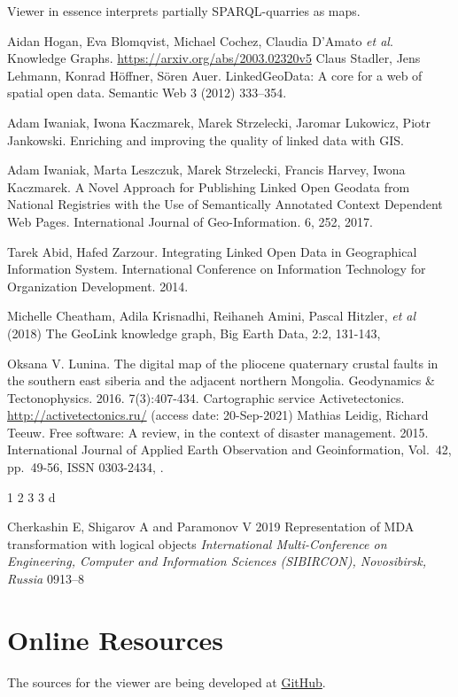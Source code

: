 \documentclass[
]{ceurart}
\begin{document}
Viewer in essence interprets partially SPARQL-quarries as maps.

\begin{acknowledgments}

\end{acknowledgments}

% 

\begin{thebibliography}{99}

 Aidan Hogan, Eva Blomqvist, Michael Cochez, Claudia D’Amato \emph{et al}. Knowledge Graphs. \url{https://arxiv.org/abs/2003.02320v5}
 Claus Stadler, Jens Lehmann, Konrad Höffner, Sören Auer. LinkedGeoData: A core for a web of spatial open data. Semantic Web 3 (2012) 333–354. 

 Adam Iwaniak, Iwona Kaczmarek, Marek Strzelecki, Jaromar Lukowicz, Piotr Jankowski. Enriching and improving the quality of linked data with GIS. 

 Adam Iwaniak, Marta Leszczuk, Marek Strzelecki, Francis Harvey, Iwona Kaczmarek. A Novel Approach for Publishing Linked Open Geodata from National Registries with the Use of Semantically Annotated Context Dependent Web Pages. International Journal of Geo-Information. 6, 252, 2017. 

 Tarek Abid, Hafed Zarzour. Integrating Linked Open Data in Geographical
Information System. International Conference on Information Technology for Organization Development. 2014.

 Michelle Cheatham, Adila Krisnadhi, Reihaneh Amini, Pascal Hitzler, \emph{et al} (2018) The GeoLink knowledge graph, Big Earth Data, 2:2, 131-143, 

 Oksana V. Lunina.  The digital map of the pliocene quaternary crustal faults in the southern east siberia and the adjacent northern Mongolia. Geodynamics \& Tectonophysics. 2016. 7(3):407-434. 
 Cartographic service Activetectonics. \url{http://activetectonics.ru/} (access date: 20-Sep-2021)
 Mathias Leidig, Richard Teeuw. Free software: A review, in the context of disaster management. 2015. International Journal of Applied Earth Observation and Geoinformation,
Vol.~42, pp.~49-56, ISSN 0303-2434, .

 1
 2
 3
 3
 d

  Cherkashin E, Shigarov A and Paramonov V 2019 Representation of MDA transformation with logical objects \emph{International Multi-Conference on Engineering, Computer and Information Sciences (SIBIRCON), Novosibirsk, Russia} 0913--8 


\end{thebibliography}

\appendix

\section{Online Resources}

The sources for the viewer are being developed at
\href{https://github.com/De17eon/GRL}{GitHub}.
\end{document}
